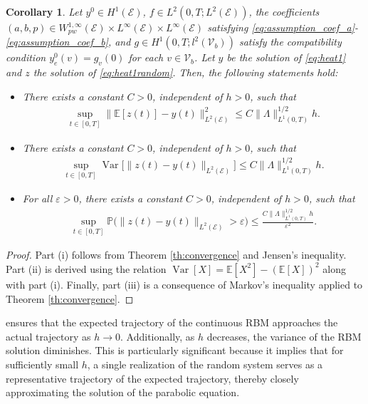 \documentclass[a4paper, 10pt, english]{article}
\DeclareMathOperator{\Var}{Var}
\def\to{\rightarrow}
\newtheorem{corollary}{Corollary}[section]
\begin{document}
\begin{corollary}\label{coro:convergence}Let $y^0 \in H^1(\mathcal{E})$, $f \in L^2(0, T; L^2(\mathcal{E}))$, the coefficients $(a, b, p) \in W^{1,\infty}_{pw}(\mathcal{E}) \times L^\infty(\mathcal{E}) \times L^\infty(\mathcal{E})$ satisfying \eqref{eq:assumption_coef_a}-\eqref{eq:assumption_coef_b}, and $g \in H^1(0, T; l^2(\mathcal{V}_b))$ satisfy the compatibility condition $y^0_e(v) = g_v(0)$ for each $v \in \mathcal{V}_b$. Let $y$ be the solution of \eqref{eq:heat1} and $z$ the solution of \eqref{eq:heat1random}. Then, the following statements hold:
    \begin{itemize}
        \item[(i)] There exists a constant $C > 0$, independent of $h > 0$, such that 
        \begin{align*}
            \sup_{t \in [0, T]} \|\mathbb{E}[z(t)] - y(t)\|_{L^2(\mathcal{E})}^2 \leq C \|\Lambda\|_{L^1(0, T)}^{1/2} h.
        \end{align*}
        
        \item[(ii)] There exists a constant $C > 0$, independent of $h > 0$, such that 
        \begin{align*}
            \sup_{t \in [0, T]} \Var\big[\|z(t) - y(t)\|_{L^2(\mathcal{E})}\big] \leq C \|\Lambda\|_{L^1(0, T)}^{1/2} h.
        \end{align*}
        
        \item[(iii)] For all $\varepsilon > 0$, there exists a constant $C > 0$, independent of $h > 0$, such that 
        \begin{align*}
            \sup_{t \in [0, T]}\mathbb{P}\bigg( \|z(t) - y(t)\|_{L^2(\mathcal{E})} > \varepsilon\bigg) \leq \frac{C \|\Lambda\|_{L^1(0, T)}^{1/2} h}{\varepsilon^2}.
        \end{align*}
    \end{itemize}
\end{corollary}

\begin{proof}
    Part (i) follows from Theorem \ref{th:convergence} and Jensen's inequality. Part (ii) is derived using the relation $\Var[X] = \mathbb{E}[X^2] - (\mathbb{E}[X])^2$ along with part (i). Finally, part (iii) is a consequence of Markov's inequality applied to Theorem \ref{th:convergence}.
\end{proof}

 ensures that the expected trajectory of the continuous RBM approaches the actual trajectory as $h \to 0$. Additionally, as $h$ decreases, the variance of the RBM solution diminishes. This is particularly significant because it implies that for sufficiently small $h$, a single realization of the random system serves as a representative trajectory of the expected trajectory, thereby closely approximating the solution of the parabolic equation. 
\end{document}

